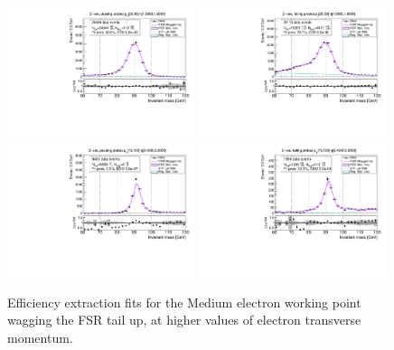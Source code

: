 \begin{figure}
\centering
\includegraphics[width=0.49\textwidth]{figures/Zee_WagFsrUp_BkgLPiEMu_pass_ptBin3_etaBin23.pdf}
\includegraphics[width=0.49\textwidth]{figures/Zee_WagFsrUp_BkgLPiEMu_fail_ptBin3_etaBin23.pdf}
\includegraphics[width=0.49\textwidth]{figures/Zee_WagFsrUp_BkgLPiEMu_pass_ptBin14_etaBin17.pdf}
\includegraphics[width=0.49\textwidth]{figures/Zee_WagFsrUp_BkgLPiEMu_fail_ptBin14_etaBin17.pdf}
\caption{Efficiency extraction fits for the Medium electron working point wagging the FSR tail up, at higher values of electron transverse momentum.}
\label{fig:ZeeAltSigFSRFits2}
\end{figure}
